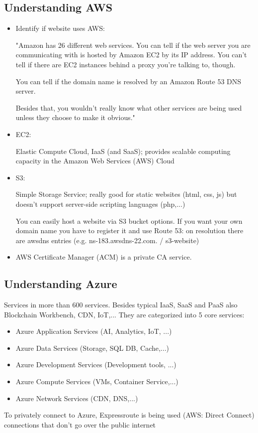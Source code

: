 \documentclass[12pt]{article}
\begin{document}
\newpage
\subsection*{Understanding AWS}
\begin{itemize}
    \item Identify if website uses AWS:
    
    "Amazon has 26 different web services. You can tell if the web server you are communicating with is hosted by Amazon EC2 by its IP address. You can't tell if there are EC2 instances behind a proxy you're talking to, though.

    You can tell if the domain name is resolved by an Amazon Route 53 DNS server.

    Besides that, you wouldn't really know what other services are being used unless they choose to make it obvious."
    
    \item EC2:
    
    Elastic Compute Cloud, IaaS (and SaaS); provides scalable computing capacity in the Amazon Web Services (AWS) Cloud
    
    \item S3:
    
    Simple Storage Service; really good for static websites (html, css, js) but doesn't support server-side scripting languages (php,...)
    
    You can easily host a website via S3 bucket options. If you want your own domain name you have to register it and use Route 53: on resolution there are awsdns entries (e.g. ns-183.awsdns-22.com. / s3-website)
    
    \item AWS Certificate Manager (ACM) is a private CA service.
    
\end{itemize}

\subsection*{Understanding Azure}
Services in more than 600 services. Besides typical IaaS, SaaS and PaaS also Blockchain Workbench, CDN, IoT,... They are categorized into 5 core services:
\begin{itemize}
    \item Azure Application Services (AI, Analytics, IoT, ...)
    \item Azure Data Services (Storage, SQL DB, Cache,...)
    \item Azure Development Services (Development tools, ...)
    \item Azure Compute Services (VMs, Container Service,...)
    \item Azure Network Services (CDN, DNS,...)
\end{itemize}
To privately connect to Azure, Expressroute is being used (AWS: Direct Connect) connections that don't go over the public internet
\end{document}
